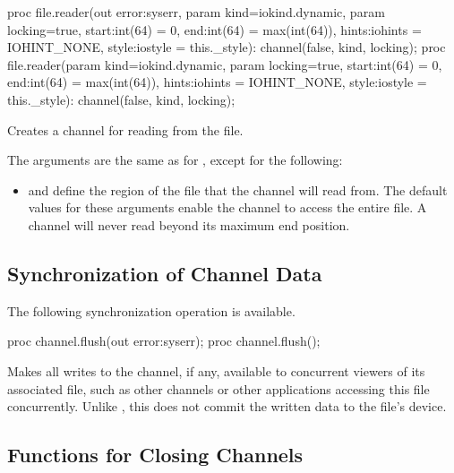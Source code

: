 \begin{protohead}
proc file.reader(out error:syserr, param kind=iokind.dynamic, param locking=true,
                 start:int(64) = 0, end:int(64) = max(int(64)), hints:iohints = IOHINT_NONE,
                 style:iostyle = this._style): channel(false, kind, locking);
proc file.reader(param kind=iokind.dynamic, param locking=true,
                 start:int(64) = 0, end:int(64) = max(int(64)), hints:iohints = IOHINT_NONE,
                 style:iostyle = this._style): channel(false, kind, locking);
\end{protohead}
\begin{protobody}
Creates a channel for reading from the file.

The arguments are the same as for , except for the following:

\begin{itemize}

\item {} and  define the region of the file that
      the channel will read from. The default values for these arguments enable
      the channel to access the entire file.
      A channel will never read beyond its maximum end position.

\end{itemize}
\end{protobody}


\subsection{Synchronization of Channel Data}
\label{IO_channel_synchronization}

The following synchronization operation is available.

\begin{protohead}
proc channel.flush(out error:syserr);
proc channel.flush();
\end{protohead}
\begin{protobody}
Makes all writes to the channel, if any, available to concurrent viewers
of its associated file, such as other channels or other applications
accessing this file concurrently.
Unlike , this does not commit the written data
to the file's device.
\end{protobody}


\subsection{Functions for Closing Channels}
\label{IO_closing_channels}

